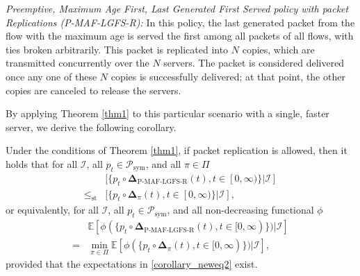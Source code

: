 \begin{definition} \emph{Preemptive, Maximum Age First, Last Generated First Served policy with packet Replications  (P-MAF-LGFS-R):} In this policy, the last generated packet from the flow with the maximum age is served the first among all packets of all flows, with ties broken arbitrarily. This packet is replicated into $N$ copies, which are transmitted concurrently over the $N$ servers. The packet is considered delivered once any one of these $N$ copies is successfully delivered; at that point, the other copies are canceled to release the servers.
\end{definition}



By applying Theorem \ref{thm1} to this particular scenario with a single, faster server, we derive the following corollary.


\begin{corollary}\label{corollary_new}
Under the conditions of  Theorem \ref{thm1}, if packet replication is allowed, then it holds that for all $\mathcal{I}$, all $p_t \in\mathcal{P}_{\text{sym}}$, and all $\pi\in\Pi$ 
\begin{align}\label{corollary_neweq1}
&[\{p_t \circ\bm{\Delta}_{\text{P-MAF-LGFS-R}}(t), t\in [0,\infty)\}\vert\mathcal{I}] \nonumber\\
\leq_{\text{st}} & [\{p_t \circ\bm{\Delta}_\pi(t), t\in [0,\infty)\}\vert\mathcal{I}],
\end{align}
or equivalently, for all $\mathcal{I}$, all $p_t \in\mathcal{P}_{\text{sym}}$, and all non-decreasing functional $\phi$
 \begin{align}\label{corollary_neweq2}
&\mathbb{E}\left[\phi (\{p_t \circ\bm{\Delta}_{\text{P-MAF-LGFS-R}}(t),t\in [0,\infty)\})\vert\mathcal{I}\right] \nonumber\\
= & \min_{\pi\in\Pi} \mathbb{E}\left[\phi (\{p_t \circ\bm{\Delta}_\pi(t),t\in [0,\infty)\})\vert\mathcal{I}\right],
\end{align}
provided that the expectations in \eqref{corollary_neweq2} exist.
\end{corollary}


